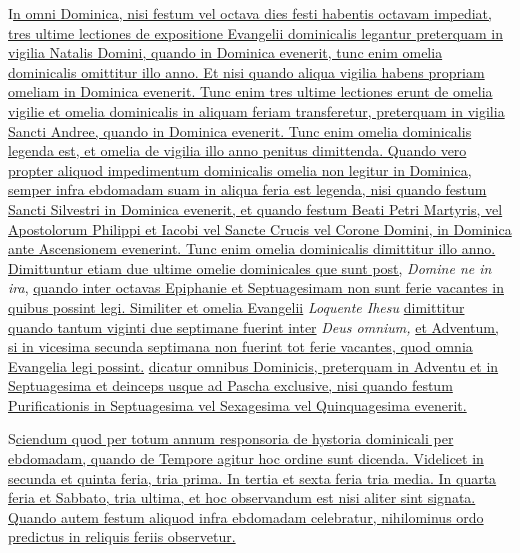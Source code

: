 \begin{multicols*}{2}
{\color{Red} }
\lettrine[lines=2]{\zallmancaps \color{Red} I}{}\ul{n omni Dominica, nisi festum vel octava dies festi habentis octavam impediat, tres ultime lectiones de expositione Evangelii dominicalis legantur preterquam in vigilia Natalis Domini, quando in Dominica evenerit, tunc enim omelia dominicalis omittitur illo anno. Et nisi quando aliqua vigilia habens propriam omeliam in Dominica evenerit. Tunc enim tres ultime lectiones erunt de omelia vigilie et omelia dominicalis in aliquam feriam transferetur, preterquam in vigilia Sancti Andree, quando in Dominica evenerit. Tunc enim omelia dominicalis legenda est, et omelia de vigilia illo anno penitus dimittenda. Quando vero propter aliquod impedimentum dominicalis omelia non legitur in Dominica, semper infra ebdomadam suam in aliqua feria est legenda, nisi quando festum Sancti Silvestri in Dominica evenerit, et quando festum Beati Petri Martyris, vel Apostolorum Philippi et Iacobi vel Sancte Crucis vel Corone Domini, in Dominica ante Ascensionem evenerint. Tunc enim omelia dominicalis dimittitur illo anno. Dimittuntur etiam due ultime omelie dominicales que sunt post,} \textit{Domine ne in ira}, \ul{quando inter octavas Epiphanie et Septuagesimam non sunt ferie vacantes in quibus possint legi. Similiter et omelia Evangelii} \textit{Loquente Ihesu} \ul{dimittitur quando tantum viginti due septimane fuerint inter} \textit{Deus omnium,} \ul{et Adventum, si in vicesima secunda septimana non fuerint tot ferie vacantes, quod omnia Evangelia legi possint.}
 \ul{dicatur omnibus Dominicis, preterquam in Adventu et in Septuagesima et deinceps usque ad Pascha exclusive, nisi quando festum Purificationis in Septuagesima vel Sexagesima vel Quinquagesima evenerit.}

{\color{Red} }
\lettrine[lines=2]{\zallmancaps \color{Blue} S}{}\ul{ciendum quod per totum annum responsoria de hystoria dominicali per ebdomadam, quando de Tempore agitur hoc ordine sunt dicenda. Videlicet in secunda et quinta feria, tria prima. In tertia et sexta feria tria media. In quarta feria et Sabbato, tria ultima, et hoc observandum est nisi aliter sint signata. Quando autem festum aliquod infra ebdomadam celebratur, nihilominus ordo predictus in reliquis feriis observetur.}


\end{multicols*}
